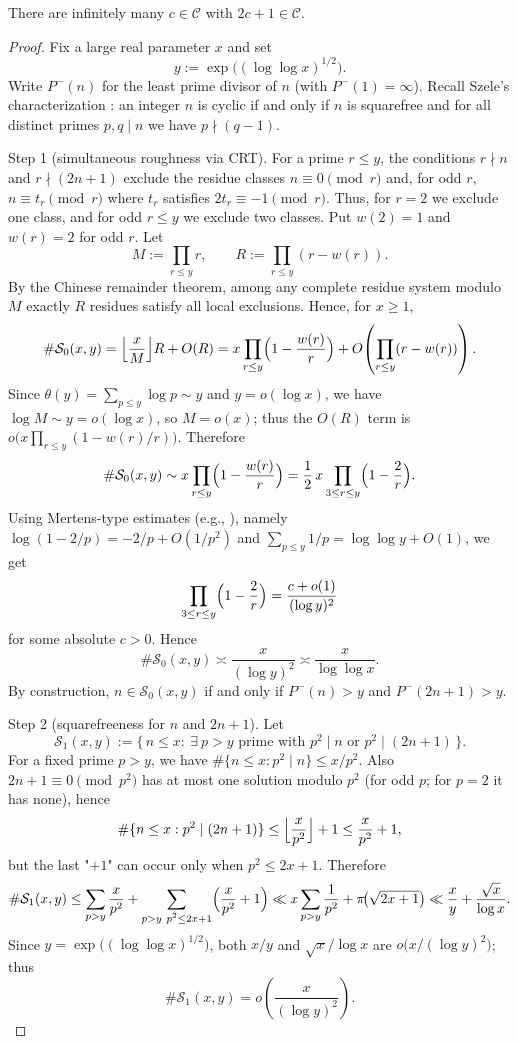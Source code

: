 \begin{theorem}\label{thm:infinitely_many_sg_cyclics}
There are infinitely many \(c\in\mathcal{C}\) with \(2c+1\in\mathcal{C}\).
\end{theorem}

\begin{proof}
Fix a large real parameter $x$ and set
$$y:=\exp\bigl((\log\log x)^{1/2}\bigr).$$
Write $P^-(n)$ for the least prime divisor of $n$ (with $P^-(1)=\infty$). Recall Szele's characterization \cite{Szele1947}: an integer $n$ is cyclic if and only if $n$ is squarefree and for all distinct primes $p,q\mid n$ we have $p\nmid(q-1)$.

Step 1 (simultaneous roughness via CRT). For a prime $r\le y$, the conditions $r\nmid n$ and $r\nmid(2n+1)$ exclude the residue classes $n\equiv0\pmod r$ and, for odd $r$, $n\equiv t_r\pmod r$ where $t_r$ satisfies $2t_r\equiv-1\pmod r$. Thus, for $r=2$ we exclude one class, and for odd $r\le y$ we exclude two classes. Put $w(2)=1$ and $w(r)=2$ for odd $r$. Let
$$M:=\prod_{r\le y} r,\qquad R:=\prod_{r\le y}(r-w(r)).$$
By the Chinese remainder theorem, among any complete residue system modulo $M$ exactly $R$ residues satisfy all local exclusions. Hence, for $x\ge1$,
$$\#\mathcal S_0(x,y)=\Bigl\lfloor\frac{x}{M}\Bigr\rfloor R+O(R)
= x\prod_{r\le y}\Bigl(1-\frac{w(r)}{r}\Bigr)+O\!\left(\prod_{r\le y}(r-w(r))\right).$$
Since $\theta(y)=\sum_{p\le y}\log p\sim y$ and $y=o(\log x)$, we have $\log M\sim y=o(\log x)$, so $M=o(x)$; thus the $O(R)$ term is $o\bigl(x\prod_{r\le y}(1-w(r)/r)\bigr)$. Therefore
$$\#\mathcal S_0(x,y)\sim x\prod_{r\le y}\Bigl(1-\frac{w(r)}{r}\Bigr)=\frac{1}{2}\,x\prod_{3\le r\le y}\Bigl(1-\frac{2}{r}\Bigr).$$
Using Mertens-type estimates (e.g., \cite{Apostol1976}), namely $\log(1-2/p)=-2/p+O(1/p^2)$ and $\sum_{p\le y}1/p=\log\log y+O(1)$, we get
$$\prod_{3\le r\le y}\Bigl(1-\frac{2}{r}\Bigr)=\frac{c+o(1)}{(\log y)^2}$$
for some absolute $c>0$. Hence
$$\#\mathcal S_0(x,y)\asymp \frac{x}{(\log y)^2}\asymp \frac{x}{\log\log x}.$$
By construction, $n\in\mathcal S_0(x,y)$ if and only if $P^-(n)>y$ and $P^-(2n+1)>y$.

Step 2 (squarefreeness for $n$ and $2n+1$). Let
$$\mathcal S_1(x,y):=\{\,n\le x:\ \exists\ p>y\text{ prime with }p^2\mid n\text{ or }p^2\mid(2n+1)\,\}.$$
For a fixed prime $p>y$, we have $\#\{n\le x: p^2\mid n\}\le x/p^2$. Also $2n+1\equiv0\pmod{p^2}$ has at most one solution modulo $p^2$ (for odd $p$; for $p=2$ it has none), hence
$$\#\{n\le x: p^2\mid(2n+1)\}\le \Bigl\lfloor\frac{x}{p^2}\Bigr\rfloor+1\le \frac{x}{p^2}+1,$$
but the last "$+1$" can occur only when $p^2\le 2x+1$. Therefore
\[
\#\mathcal S_1(x,y)\le \sum_{p>y}\frac{x}{p^2}+\sum_{\substack{p>y\ p^2\le 2x+1}}\Bigl(\frac{x}{p^2}+1\Bigr)
\ll x\sum_{p>y}\frac{1}{p^2}+\pi\!\bigl(\sqrt{2x+1}\bigr)
\ll \frac{x}{y}+\frac{\sqrt{x}}{\log x}.
\]
Since $y=\exp\bigl((\log\log x)^{1/2}\bigr)$, both $x/y$ and $\sqrt{x}/\log x$ are $o\bigl(x/(\log y)^2\bigr)$; thus
$$\#\mathcal S_1(x,y)=o\!\left(\frac{x}{(\log y)^2}\right).$$


\end{proof}
